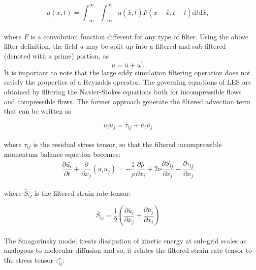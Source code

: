 \documentclass[a5paper]{sapthesis}
\begin{document}
 	\begin{equation}
 			\overline{u(x,t)} = \int_{-\infty}^{\infty} \int_{-\infty}^{\infty} u(\bar{x},\bar{t})F(x-\bar{x},t-\bar{t}) \mathrm{d}{t} \mathrm{d}\bar{x},
 	\end{equation}
 	\\
 	where $F$ is a convolution function different for any type of filter. Using the above filter definition, the field $u$ may be split up into a filtered and sub-filtered (denoted with a prime) portion, as 
 	\begin{equation}
 		{u ={\bar{u}}+u^{\prime }.}
 	\end{equation}
 	It is important to note that the large eddy simulation filtering operation does not satisfy the properties of a Reynolds operator. 
 	The governing equations of LES are obtained by filtering the Navier-Stokes equations both for incompressible flows and compressible flows. 
	The former approach generate the filtered advection term that can be written as 
	
	\begin{equation}
		\overline{u_i u_j} = \tau_{ij} + \bar{u}_i\bar{u}_j
	\end{equation}
	\\
	where $\tau_{ij}$ is the residual stress tensor, so that the filtered incompressible momentum balance equation becomes: 
	\begin{equation}
				\frac{\partial{\bar{u_i}}}{\partial{t}} + \frac{\partial}{\partial{x_j}} (\bar{u_i}\bar{u_j}) = -\frac{1}{\rho}\frac{\partial{\bar{p}}}{\partial{x_i}} + 2\nu \frac{\partial{\bar{S_{ij}}}}{\partial{x_j}} -\frac{\partial{\tau_{ij}}}{\partial{x_j}}
	\end{equation}
	\\
	where $\bar{S}_{ij}$ is the filtered strain rate tensor:
	
	\begin{equation}
		\bar{S}_{ij} = \frac{1}{2}\left(\frac{\partial \bar{u}_i}{\partial x_j} + \frac{\partial \bar{u}_j}{\partial x_i}\right)
	\end{equation}
	\\
	The Smagorinsky model treats dissipation of kinetic energy at sub-grid scales as analogous to molecular diffusion and so, it relates the filtered strain rate tensor to the stress tensor $\tau_{ij}^r$:
	
\end{document}
